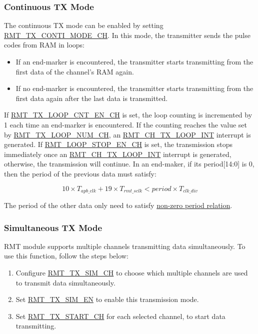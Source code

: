 \documentclass[main\_\_EN.tex]{subfiles}
\begin{document}
\subsubsection{Continuous TX Mode}


The continuous TX mode can be enabled by setting \hyperref[fielddesc:RMTTXCONTIMODECHN]{RMT\_TX\_CONTI\_MODE\_CH}. In this mode, the transmitter sends the pulse codes from RAM in loops:
\begin{itemize}
    \item If an end-marker is encountered, the transmitter starts transmitting from the first data of the channel's RAM again.
    \item If no end-marker is encountered, the transmitter starts transmitting from the first data again after the last data is transmitted.
\end{itemize}

If \hyperref[fielddesc:RMTTXLOOPCNTENCHN]{RMT\_TX\_LOOP\_CNT\_EN\_CH} is set, the loop counting is incremented by 1 each time an end-marker is encountered. If the counting reaches the value set by \hyperref[fielddesc:RMTTXLOOPNUMCHN]{RMT\_TX\_LOOP\_NUM\_CH}, an \hyperref[int:RMTCHnTXLOOPINT]{RMT\_CH\_TX\_LOOP\_INT} interrupt is generated. If \hyperref[fielddesc:RMTLOOPSTOPENCHN]{RMT\_LOOP\_STOP\_EN\_CH} is set, the transmission stops immediately once an \hyperref[int:RMTCHnTXLOOPINT]{RMT\_CH\_TX\_LOOP\_INT} interrupt is generated, otherwise, the transmission will continue. In an end-maker, if its period[14:0] is 0, then the period of the previous data must satisfy:

\begin{equation}
10 \times T_{apb\_clk} + 19 \times T_{rmt\_sclk} < period \times T_{clk\_div}
\end{equation}

The period of the other data only need to satisfy \hyperref[eq:rmt-period-value]{non-zero period relation}.

\subsubsection{Simultaneous TX Mode}

RMT module supports multiple channels transmitting data simultaneously. To use this function, follow the steps below:

\begin{enumerate}
    \item Configure \hyperref[fielddesc:RMTTXSIMCHN]{RMT\_TX\_SIM\_CH} to choose which multiple channels are used to transmit data simultaneously.
    \item Set \hyperref[fielddesc:RMTTXSIMEN]{RMT\_TX\_SIM\_EN} to enable this transmission mode.
    \item Set \hyperref[fielddesc:RMTTXSTARTCHN]{RMT\_TX\_START\_CH} for each selected channel, to start data transmitting.
\end{enumerate}
\end{document}
